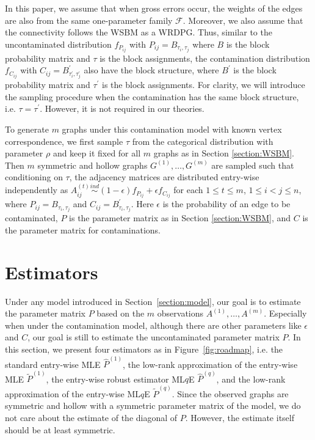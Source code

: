 \documentclass[a4paper]{article}
\renewcommand{\hat}{\widehat}
\begin{document}
In this paper, we assume that when gross errors occur, the weights of the edges are also from the same one-parameter family $\mathcal{F}$. Moreover, we also assume that the connectivity follows the WSBM as a WRDPG. Thus, similar to the uncontaminated distribution $f_{P_{ij}}$ with $P_{ij} = B_{\tau_i, \tau_j}$ where $B$ is the block probability matrix and $\tau$ is the block assignments, the contamination distribution $f_{C_{ij}}$ with $C_{ij} = B^{\prime}_{\tau^{\prime}_i, \tau^{\prime}_j}$ also have the block structure, where $B^{\prime}$ is the block probability matrix and $\tau^{\prime}$ is the block assignments. For clarity, we will introduce the sampling procedure when the contamination has the same block structure, i.e. $\tau = \tau^{\prime}$. However, it is not required in our theories.

To generate $m$ graphs under this contamination model with known vertex correspondence, we first sample $\tau$ from the categorical distribution with parameter $\rho$ and keep it fixed for all $m$ graphs as in Section \ref{section:WSBM}. Then $m$ symmetric and hollow graphs $G^{(1)}, \dotsc, G^{(m)}$ are sampled such that conditioning on $\tau$, the adjacency matrices are distributed entry-wise independently as $A^{(t)}_{ij} \stackrel{ind}{\sim} (1-\epsilon) f_{P_{ij}} + \epsilon f_{C_{ij}}$ for each $1 \le t \le m$, $1 \le i < j \le n$, where $P_{ij} = B_{\tau_i, \tau_j}$ and $C_{ij} = B^{\prime}_{\tau_i, \tau_j}$. Here $\epsilon$ is the probability of an edge to be contaminated, $P$ is the parameter matrix as in Section \ref{section:WSBM}, and $C$ is the parameter matrix for contaminations.



\section{Estimators}
\label{section:estimators}
Under any model introduced in Section~\ref{section:model}, our goal is to estimate the parameter matrix $P$ based on the $m$ observations $A^{(1)}, \dotsc, A^{(m)}$. Especially when under the contamination model, although there are other parameters like $\epsilon$ and $C$, our goal is still to estimate the uncontaminated parameter matrix $P$. In this section, we present four estimators as in Figure~\ref{fig:roadmap}, i.e. the standard entry-wise MLE $\hat{P}^{(1)}$, the low-rank approximation of the entry-wise MLE $\widetilde{P}^{(1)}$, the entry-wise robust estimator ML$q$E $\hat{P}^{(q)}$, and the low-rank approximation of the entry-wise ML$q$E $\widetilde{P}^{(q)}$. Since the observed graphs are symmetric and hollow with a symmetric parameter matrix of the model, we do not care about the estimate of the diagonal of $P$. However, the estimate itself should be at least symmetric.
\end{document}
